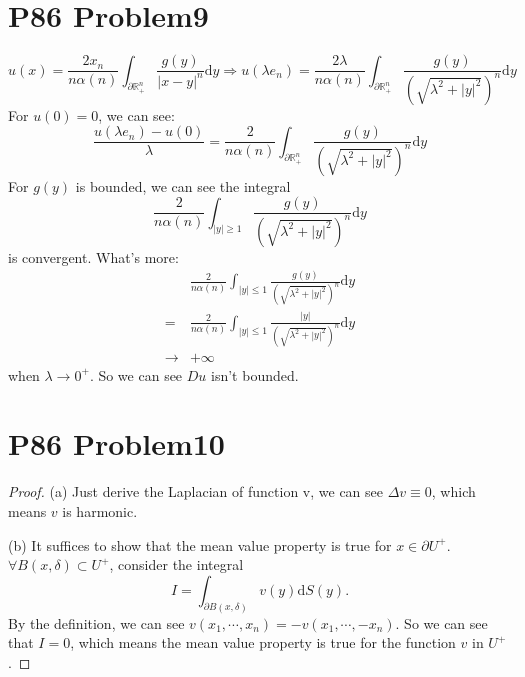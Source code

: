 \documentclass[a4paper]{ctexart}
\newcommand{\dif}{\mathrm{d}}
\begin{document}
\section*{P86 Problem9}
\begin{equation}
    u(x)=\frac{2x_{n}}{n\alpha(n)}\int_{\partial\mathbb{R}_{+}^{n}}\frac{g(y)}{|x-y|^{n}}\dif y
    \Rightarrow u(\lambda e_{n})=\frac{2\lambda}{n\alpha(n)}\int_{\partial\mathbb{R}_{+}^{n}}\frac{g(y)}{(\sqrt{\lambda^{2}+|y|^{2}})^{n}}\dif y
\end{equation}
For $u(0)=0$, we can see:
\begin{equation}
\frac{u(\lambda e_{n})-u(0)}{\lambda}=\frac{2}{n\alpha(n)}\int_{\partial\mathbb{R}_{+}^{n}}\frac{g(y)}{(\sqrt{\lambda^{2}+|y|^{2}})^{n}}\dif y
\end{equation}
For $g(y)$ is bounded, we can see the integral
\begin{equation}
    \frac{2}{n\alpha(n)}\int_{|y|\ge1}\frac{g(y)}{(\sqrt{\lambda^{2}+|y|^{2}})^{n}}\dif y
\end{equation}
is convergent. What's more:
\begin{equation}
    \begin{aligned}
        &\frac{2}{n\alpha(n)}\int_{|y|\le1}\frac{g(y)}{(\sqrt{\lambda^{2}+|y|^{2}})^{n}}\dif y\\
        =&\frac{2}{n\alpha(n)}\int_{|y|\le 1}\frac{|y|}{(\sqrt{\lambda^{2}+|y|^{2}})^{n}}\dif y\\
        \rightarrow&+\infty
    \end{aligned}
\end{equation}
when $\lambda\rightarrow 0^{+}$. So we can see $Du$ isn't bounded.
\section*{P86 Problem10}
\begin{proof}
    (a) Just derive the Laplacian of function v, we can see $\Delta v\equiv 0$, which means $v$ is harmonic.

    (b) It suffices to show that the mean value property is true for $x\in\partial U^{+}$.
    $\forall B(x,\delta)\subset U^{+}$, consider the integral
    $$
    I=\int_{\partial B(x,\delta)}v(y)\dif S(y).
    $$
    By the definition, we can see $v(x_{1},\cdots,x_{n})=-v(x_{1},\cdots,-x_{n})$. So we can see that $I=0$, 
    which means the mean value property is true for the function $v$ in $U^{+}$.
\end{proof}
\end{document}
